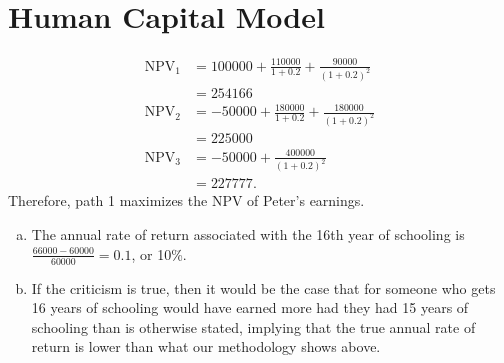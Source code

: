 \documentclass[8pt]{extarticle}
\title{}
\author{}
\date{}
\begin{document}
  \section{Human Capital Model}%
  \begin{description}[font=\normalfont]
    \item[(1)]
      \begin{align*}
        \text{NPV}_{1} &= 100000 + \frac{110000}{1 + 0.2} + \frac{90000}{(1 + 0.2)^2}\\
                       &= 254166\\
        \text{NPV}_2 &= -50000 + \frac{180000}{1 + 0.2} + \frac{180000}{(1+0.2)^2}\\
                     &= 225000\\
        \text{NPV}_3 &= -50000 + \frac{400000}{(1+0.2)^2}\\
                     &= 227777.
      \end{align*}
      Therefore, path 1 maximizes the NPV of Peter's earnings.
    \item[(2)]\hfill
      \begin{enumerate}[(a)]
        \item The annual rate of return associated with the 16th year of schooling is $\frac{66000-60000}{60000}=0.1$, or 10\%. 
        \item If the criticism is true, then it would be the case that for someone who gets 16 years of schooling would have earned more had they had 15 years of schooling than is otherwise stated, implying that the true annual rate of return is lower than what our methodology shows above.
      \end{enumerate}
  \end{description}
\end{document}

